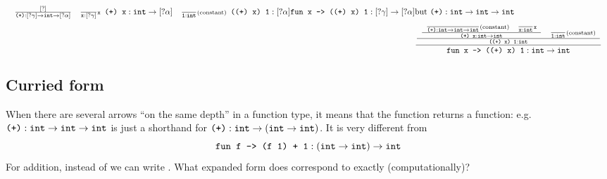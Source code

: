 \documentclass{article}
\newcommand{\tmverbatim}[1]{\text{{\ttfamily{#1}}}}
\begin{document}
\begin{eqnarray*}
{{\begin{array}{ll}
{\begin{array}{ll}
      \frac{[?]}{\text{\tmverbatim{(+)}} : [? \gamma] \rightarrow
      \text{\tmverbatim{int}} \rightarrow [? \alpha]} &
      \frac{}{\text{\tmverbatim{x}} : [? \gamma]}
      \scriptsize{\text{\tmverbatim{x}}}
    \end{array}}{\text{\tmverbatim{(+) x}} : \text{\tmverbatim{int}}
    \rightarrow [? \alpha]} & \frac{}{\text{\tmverbatim{1}} :
    \text{\tmverbatim{int}}} \scriptsize{\text{(constant)}}
  \end{array}}{\text{\tmverbatim{((+) x) 1}} : [?
  \alpha]}}{\text{\tmverbatim{fun x -> ((+) x) 1}} : [? \gamma] \rightarrow [?
  \alpha]} & \text{but \tmverbatim{(+)}} : \text{\tmverbatim{int}} \rightarrow
  \text{\tmverbatim{int}} \rightarrow \text{\tmverbatim{int}}\\
  & \frac{\frac{\begin{array}{ll}
    \frac{\begin{array}{ll}
      \frac{}{\text{\tmverbatim{(+)}} : \text{\tmverbatim{int}} \rightarrow
      \text{\tmverbatim{int}} \rightarrow \text{\tmverbatim{int}}}
      \scriptsize{\text{(constant)}} & \frac{}{\text{\tmverbatim{x}} :
      \text{\tmverbatim{int}}} \scriptsize{\text{\tmverbatim{x}}}
    \end{array}}{\text{\tmverbatim{(+) x}} : \text{\tmverbatim{int}}
    \rightarrow \text{\tmverbatim{int}}} & \frac{}{\text{\tmverbatim{1}} :
    \text{\tmverbatim{int}}} \scriptsize{\text{(constant)}}
  \end{array}}{\text{\tmverbatim{((+) x) 1}} :
  \text{\tmverbatim{int}}}}{\text{\tmverbatim{fun x -> ((+) x) 1}} :
  \text{\tmverbatim{int}} \rightarrow \text{\tmverbatim{int}}} & 
\end{eqnarray*}
{\newpage}

\subsection{Curried form}

When there are several arrows ``on the same depth'' in a function type, it
means that the function returns a function: e.g. $\text{\tmverbatim{(+)}} :
\text{\tmverbatim{int}} \rightarrow \text{\tmverbatim{int}} \rightarrow
\text{\tmverbatim{int}}$ is just a shorthand for $\text{\tmverbatim{(+)}} :
\text{\tmverbatim{int}} \rightarrow \left( \text{\tmverbatim{int}} \rightarrow
\text{\tmverbatim{int}} \right)$. It is very different from
\[ \text{\tmverbatim{fun f -> (f 1) + 1}} : \left( \text{\tmverbatim{int}}
   \rightarrow \text{\tmverbatim{int}} \right) \rightarrow
   \text{\tmverbatim{int}} \]
For addition, instead of \tmverbatim{(fun x -> x+1)} we can write
\tmverbatim{((+) 1)}. What expanded form does \tmverbatim{((+) 1)} correspond
to exactly (computationally)?
\end{document}
